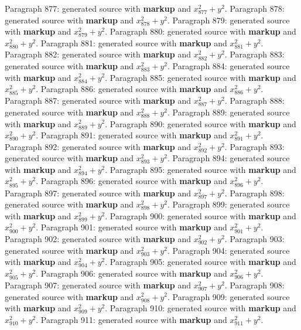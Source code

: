 \documentclass{article}
\begin{document}
Paragraph 877: generated source with \textbf{markup} and $x_{877}^2 + y^2$.
Paragraph 878: generated source with \textbf{markup} and $x_{878}^2 + y^2$.
Paragraph 879: generated source with \textbf{markup} and $x_{879}^2 + y^2$.
Paragraph 880: generated source with \textbf{markup} and $x_{880}^2 + y^2$.
Paragraph 881: generated source with \textbf{markup} and $x_{881}^2 + y^2$.
Paragraph 882: generated source with \textbf{markup} and $x_{882}^2 + y^2$.
Paragraph 883: generated source with \textbf{markup} and $x_{883}^2 + y^2$.
Paragraph 884: generated source with \textbf{markup} and $x_{884}^2 + y^2$.
Paragraph 885: generated source with \textbf{markup} and $x_{885}^2 + y^2$.
Paragraph 886: generated source with \textbf{markup} and $x_{886}^2 + y^2$.
Paragraph 887: generated source with \textbf{markup} and $x_{887}^2 + y^2$.
Paragraph 888: generated source with \textbf{markup} and $x_{888}^2 + y^2$.
Paragraph 889: generated source with \textbf{markup} and $x_{889}^2 + y^2$.
Paragraph 890: generated source with \textbf{markup} and $x_{890}^2 + y^2$.
Paragraph 891: generated source with \textbf{markup} and $x_{891}^2 + y^2$.
Paragraph 892: generated source with \textbf{markup} and $x_{892}^2 + y^2$.
Paragraph 893: generated source with \textbf{markup} and $x_{893}^2 + y^2$.
Paragraph 894: generated source with \textbf{markup} and $x_{894}^2 + y^2$.
Paragraph 895: generated source with \textbf{markup} and $x_{895}^2 + y^2$.
Paragraph 896: generated source with \textbf{markup} and $x_{896}^2 + y^2$.
Paragraph 897: generated source with \textbf{markup} and $x_{897}^2 + y^2$.
Paragraph 898: generated source with \textbf{markup} and $x_{898}^2 + y^2$.
Paragraph 899: generated source with \textbf{markup} and $x_{899}^2 + y^2$.
Paragraph 900: generated source with \textbf{markup} and $x_{900}^2 + y^2$.
Paragraph 901: generated source with \textbf{markup} and $x_{901}^2 + y^2$.
Paragraph 902: generated source with \textbf{markup} and $x_{902}^2 + y^2$.
Paragraph 903: generated source with \textbf{markup} and $x_{903}^2 + y^2$.
Paragraph 904: generated source with \textbf{markup} and $x_{904}^2 + y^2$.
Paragraph 905: generated source with \textbf{markup} and $x_{905}^2 + y^2$.
Paragraph 906: generated source with \textbf{markup} and $x_{906}^2 + y^2$.
Paragraph 907: generated source with \textbf{markup} and $x_{907}^2 + y^2$.
Paragraph 908: generated source with \textbf{markup} and $x_{908}^2 + y^2$.
Paragraph 909: generated source with \textbf{markup} and $x_{909}^2 + y^2$.
Paragraph 910: generated source with \textbf{markup} and $x_{910}^2 + y^2$.
Paragraph 911: generated source with \textbf{markup} and $x_{911}^2 + y^2$.
\end{document}

